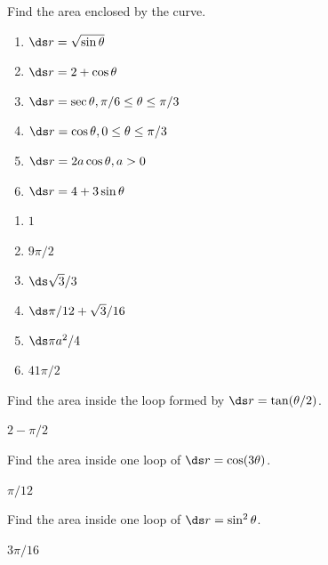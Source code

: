\begin{enumialphparenastyle}

\begin{ex}
Find the area enclosed by the curve.
\begin{multicols}{2}
\begin{enumerate}
	\item	$\ds r=\sqrt{\sin\theta}$
	\item	$\ds r=2+\cos\theta$
	\item	$\ds r=\sec\theta, \pi/6\le\theta\le\pi/3$
	\item	$\ds r=\cos\theta, 0\le\theta\le\pi/3$
	\item	$\ds r=2a\cos\theta, a>0$
	\item	$\ds r=4+3\sin\theta$
\end{enumerate}
\end{multicols}
\begin{sol}
\begin{multicols}{2}
\begin{enumerate}
	\item	$1$
	\item	$9\pi/2$
	\item	$\ds \sqrt3/3$
	\item	$\ds \pi/12+\sqrt3/16$
	\item	$\ds \pi a^2/4$
	\item	$41\pi/2$
\end{enumerate}
\end{multicols}
\end{sol}
\end{ex}

\begin{ex}
 Find the area inside the loop formed by
$\ds r=\tan(\theta/2)$.
\begin{sol}
 $2-\pi/2$
\end{sol}
\end{ex}

\begin{ex}
 Find the area inside one loop of $\ds r=\cos(3\theta)$.
\begin{sol}
 $\pi/12$
\end{sol}
\end{ex}

\begin{ex}
 Find the area inside one loop of $\ds r=\sin^2\theta$.
\begin{sol}
 $3\pi/16$
\end{sol}
\end{ex}


\end{enumialphparenastyle}
